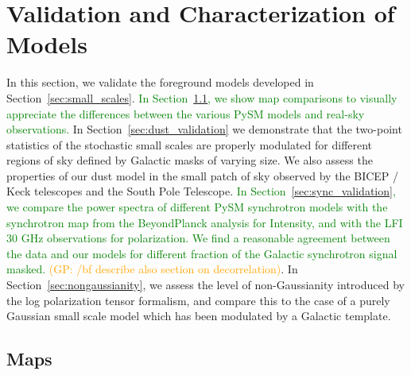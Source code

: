 \documentclass[twocolumn]{aastex631}
\newcommand{\giuse}[1]{\textcolor{orange}{(GP: #1)}}
\newcommand{\sg}[1]{\textcolor{teal}{(SG: #1)}}
\newcommand{\jd}[1]{\textcolor{green}{#1}}
\begin{document}
\section{Validation and Characterization of Models} \label{sec:validation}

In this section, we validate the foreground models developed in Section~\ref{sec:small_scales}.
%
\jd{In Section~\ref{subsec:maps}, we show map comparisons to visually appreciate the differences between the various PySM models and real-sky observations.}
%
In Section~\ref{sec:dust_validation} we demonstrate that the two-point statistics of the stochastic small scales are properly modulated for different regions of sky defined by Galactic masks of varying size. We also assess the properties of our dust model in the small patch of sky observed by the BICEP / Keck telescopes and the South Pole Telescope.  
%
\jd{In Section~\ref{sec:sync_validation}, we compare the power spectra of different PySM synchrotron models with the synchrotron map from the BeyondPlanck analysis for Intensity, and with the LFI 30 GHz observations for polarization. We find a reasonable agreement between the data and our models for different fraction of the Galactic synchrotron signal masked.}
%
\giuse{/bf describe also section on decorrelation}. In Section~\ref{sec:nongaussianity}, we assess the level of non-Gaussianity introduced by the log polarization tensor formalism, and compare this to the case of a purely Gaussian small scale model which has been modulated by a Galactic template. 


\subsection{Maps}\label{subsec:maps}
\end{document}
